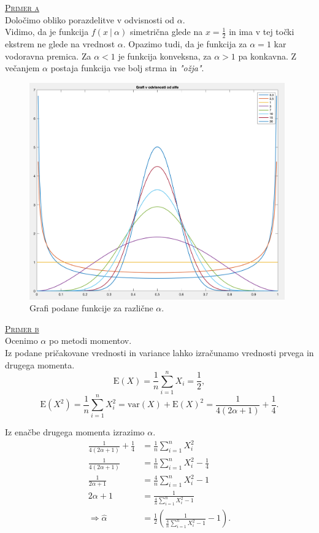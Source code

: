 \documentclass[a4paper,12pt]{article}
\begin{document}
\noindent
\textsc{\underline{Primer a}}
\\
Določimo obliko porazdelitve v odvisnosti od $\alpha$. 
\\
Vidimo, da je funkcija $f(x \ | \ \alpha)$ simetrična glede na $x = \frac{1}{2}$ in ima v tej točki ekstrem ne glede na vrednost $\alpha$. Opazimo tudi, da je funkcija za $\alpha = 1$ kar vodoravna premica. Za $\alpha < 1$ je funkcija konveksna, za $\alpha > 1$ pa konkavna. 
Z večanjem $\alpha$ postaja funkcija vse bolj strma in \textit{"ožja"}.
\\
\begin{figure}[ht!]
    \centering
    \includegraphics[width=110mm]{grafi.png}
    \caption{Grafi podane funkcije za različne $\alpha$.}
\end{figure}

\noindent
\textsc{\underline{Primer b}}
\\
Ocenimo $\alpha$ po metodi momentov.
\\
Iz podane pričakovane vrednosti in variance lahko izračunamo vrednosti prvega in drugega momenta.
$$ \text{E}(X) = \frac{1}{n} \sum_{i = 1}^{n} X_i = \frac{1}{2}, $$
$$ \text{E}(X^2) = \frac{1}{n} \sum_{i = 1}^{n} X_i^2 = \text{var}(X) + \text{E}(X)^2 = \frac{1}{4(2 \alpha + 1)} + \frac{1}{4}. $$

\noindent
Iz enačbe drugega momenta izrazimo $\alpha$.
\begin{align*}
    \frac{1}{4(2 \alpha + 1)} + \frac{1}{4} &= \frac{1}{n} \sum_{i = 1}^{n} X_i^2 
    \\
    \frac{1}{4(2 \alpha + 1)} &= \frac{1}{n} \sum_{i = 1}^{n} X_i^2 - \frac{1}{4} 
    \\
    \frac{1}{2 \alpha + 1} &= \frac{4}{n} \sum_{i = 1}^{n} X_i^2 - 1 
    \\
    2 \alpha + 1 &= \frac{1}{\frac{4}{n} \sum_{i = 1}^{n} X_i^2 - 1}
    \\
    \Rightarrow \hat{\alpha} &= \frac{1}{2} \left( \frac{1}{\frac{4}{n} \sum_{i = 1}^{n} X_i^2 - 1} - 1 \right).
\end{align*}
\end{document}
